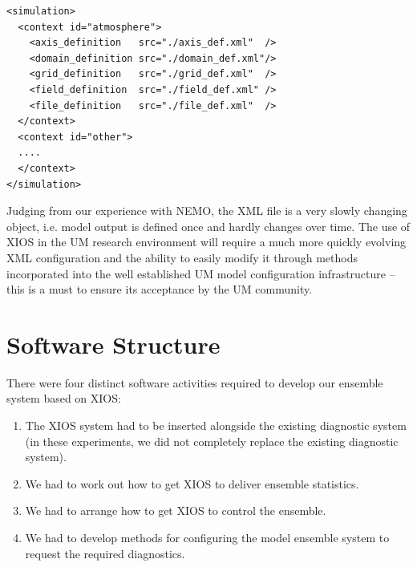 \documentclass[twocolumn, 12pt]{paper}
\begin{document}
\begin{verbatim}
<simulation>
  <context id="atmosphere">
    <axis_definition   src="./axis_def.xml"  />
    <domain_definition src="./domain_def.xml"/>
    <grid_definition   src="./grid_def.xml"  />
    <field_definition  src="./field_def.xml" />
    <file_definition   src="./file_def.xml"  />
  </context>
  <context id="other">
  ....
  </context>
</simulation>
\end{verbatim}

Judging from our experience with NEMO, the XML file is a very slowly changing object, i.e. model output is defined once and hardly changes over time.
The use of XIOS in the UM research environment will require a much more quickly evolving XML configuration and the ability to easily modify it through methods incorporated into the well established UM model configuration infrastructure -- this is a must to ensure its acceptance by the UM community.


\section{Software Structure}
\label{software}

There were four distinct software activities required to develop our ensemble system based on XIOS:

\begin{enumerate}
\item The XIOS system had to be inserted alongside the existing diagnostic system (in these experiments, we did not completely replace the existing diagnostic system).
\item We had to work out how to get XIOS to deliver ensemble statistics.
\item We had to arrange how to get XIOS to control the ensemble.
\item We had to develop methods for configuring the model ensemble system to request the required diagnostics.
\end{enumerate}
\end{document}
